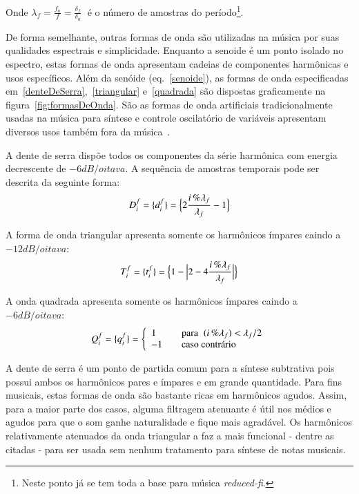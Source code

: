 Onde $\lambda_f=\frac{f_a}{f}=\frac{\delta_f}{\delta_a} \;$ é o número de amostras do período\footnote{Neste ponto já se tem toda a base para música \emph{reduced-fi}.}.

De forma semelhante, outras formas de onda são utilizadas na música por suas qualidades
espectrais e simplicidade. Enquanto a senoide é um ponto isolado no espectro, estas formas
de onda apresentam cadeias de componentes harmônicas e usos específicos.
Além da senóide (eq.~\ref{senoide}), as formas de onda especificadas em~\ref{denteDeSerra},~\ref{triangular} e~\ref{quadrada} são dispostas graficamente na figura~\ref{fig:formasDeOnda}. 
São as formas de onda artificiais tradicionalmente usadas na música para síntese e controle oscilatório de variáveis apresentam diversos usos também fora da música~\cite{Openheim}.

A dente de serra dispõe todos os componentes da série
harmônica com energia decrescente de $-6dB/oitava$. A sequência de amostras temporais pode ser descrita da seguinte forma:
\begin{equation}\label{denteDeSerra}
     D^f_i=\{ d^f_i \}=\Bigl\{ 2\frac{i\,\%\lambda_f}{\lambda_f} -1 \Bigr\}
\end{equation}

A forma de onda triangular apresenta somente os harmônicos ímpares caindo a $-12dB/oitava$:
\begin{equation}\label{triangular}
     T^f_i=\{ t^f_i \}=\Bigl\{1- \Bigl| 2 - 4\frac{i\,\%\lambda_f}{\lambda_f} \Bigr| \Bigr\}
\end{equation}

A onda quadrada apresenta somente os harmônicos ímpares caindo a $-6dB/oitava$:
\begin{equation}\label{quadrada}
     Q^f_i=\{ q^f_i \}= \left\{
         \begin{array}{l l}
              1 & \quad \text{para} \; \; (i\,\%\lambda_f)   <  \lambda_f /2  \\
              -1 & \quad \text{caso contrário}\\
         \end{array} \right.
\end{equation}

A dente de serra é um ponto de partida comum para a síntese subtrativa pois possui
ambos os harmônicos pares e ímpares e em grande quantidade. Para fins musicais, estas formas de onda são bastante ricas em harmônicos agudos.
Assim, para a maior parte dos casos, alguma filtragem atenuante
é útil nos médios e agudos para que o som ganhe naturalidade e fique mais agradável.
Os harmônicos relativamente atenuados da onda triangular
a faz a mais funcional - dentre as citadas - para ser usada sem nenhum tratamento para síntese de notas musicais.

